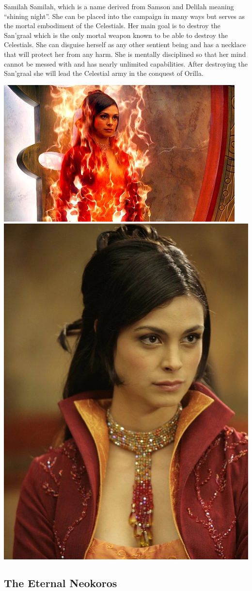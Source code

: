 \begin{commentbox}{Samilah}
	Samilah, which is a name derived from Samson and Delilah meaning ``shining night''. She can be placed into the campaign in many ways but serves as the mortal embodiment of the Celestials. Her main goal is to destroy the San'graal which is the only mortal weapon known to be able to destroy the Celestials. She can disguise herself as any other sentient being and has a necklace that will protect her from any harm. She is mentally disciplined so that her mind cannot be messed with and has nearly unlimited capabilities. After destroying the San'graal she will lead the Celestial army in the conquest of Orilla.
	\begin{center}
		\includegraphics[width=0.675\linewidth]{img/samilah.jpg} \includegraphics[width=0.29\linewidth]{img/Adria_Ark_of_Truth.jpg}
	\end{center}
\end{commentbox}

\subsection{The Eternal Neokoros}

